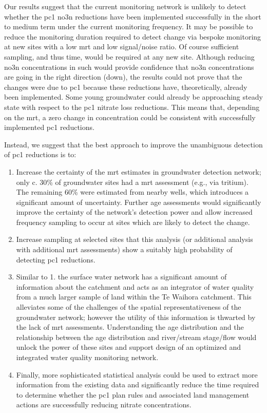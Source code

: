 Our results suggest that the current monitoring network is unlikely to detect whether the \gls{pc1} \gls{no3n} reductions have been implemented successfully in the short to medium term under the current monitoring frequency.
It may be possible to reduce the monitoring duration required to detect change via bespoke monitoring at new sites with a low \gls{mrt} and low signal/noise ratio.
Of course sufficient sampling, and thus time, would be required at any new site.
Although reducing \gls{no3n} concentrations in such would provide confidence that \gls{no3n} concentrations are going in the right direction (down), the results could not prove that the changes were due to \gls{pc1} because these reductions have, theoretically, already been implemented.
Some young groundwater could already be approaching steady state with respect to the \gls{pc1} nitrate loss reductions.
This means that, depending on the \gls{mrt}, a zero change in concentration could be consistent with successfully implemented \gls{pc1} reductions.

Instead, we suggest that the best approach to improve the unambiguous detection of \gls{pc1} reductions is to:
\begin{enumerate}
    \item Increase the certainty of the \gls{mrt} estimates in groundwater detection network; only c. 30\% of groundwater sites had a \gls{mrt} assessment (e.g., via tritium). The remaining 60\% were estimated from nearby wells, which introduces a significant amount of uncertainty. Further age assessments would significantly improve the certainty of the network's detection power and allow increased frequency sampling to occur at sites which are likely to detect the change.
    \item Increase sampling at selected sites that this analysis (or additional analysis with additional \gls{mrt} assessments) show a suitably high probability of detecting \gls{pc1} reductions.
    \item Similar to 1. the surface water network has a significant amount of information about the catchment and acts as an integrator of water quality from a much larger sample of land within the Te Waihora catchment. This alleviates some of the challenges of the spatial representativeness of the groundwater network\citep{olw_guidance}; however the utility of this information is thwarted by the lack of \gls{mrt} assessments. Understanding the age distribution and the relationship between the age distribution and river/stream stage/flow would unlock the power of these sites and support design of an optimized and integrated water quality monitoring network.
    \item Finally, more sophisticated statistical analysis could be used to extract more information from the existing data and significantly reduce the time required to determine whether the \gls{pc1} plan rules and associated land management actions are successfully reducing nitrate concentrations.
\end{enumerate}

